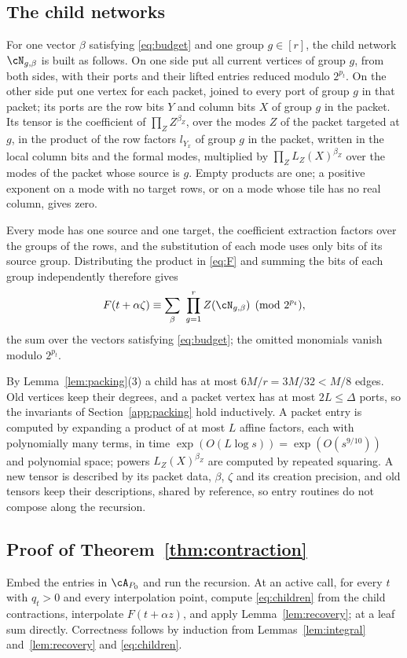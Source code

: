 \subsection{The child networks}\label{app:children}
For one vector $\beta$ satisfying \eqref{eq:budget} and one group $g\in[r]$, the
child network $\cN_{g,\beta}$ is built as follows. On one side put all current
vertices of group $g$, from both sides, with their ports and their lifted
entries reduced modulo $2^{p_t}$. On the other side put one vertex for each
packet, joined to every port of group $g$ in that packet; its ports are the row
bits $Y$ and column bits $X$ of group $g$ in the packet. Its tensor is the
coefficient of $\prod_ZZ^{\beta_Z}$, over the modes $Z$ of the packet targeted at
$g$, in the product of the row factors $l_{Y_x}$ of group $g$ in the packet,
written in the local column bits and the formal modes, multiplied by
$\prod_ZL_Z(X)^{\beta_Z}$ over the modes of the packet whose source is $g$. Empty
products are one; a positive exponent on a mode with no target rows, or on a
mode whose tile has no real column, gives zero.

Every mode has one source and one target, the coefficient extraction factors
over the groups of the rows, and the substitution of each mode uses only bits of
its source group. Distributing the product in \eqref{eq:F} and summing the bits
of each group independently therefore gives
\begin{equation}\label{eq:children}
F(t+\alpha\zeta)\equiv\sum_{\beta}\ \prod_{g=1}^rZ(\cN_{g,\beta})\pmod{2^{p_t}},
\end{equation}
the sum over the vectors satisfying \eqref{eq:budget}; the omitted monomials
vanish modulo $2^{p_t}$.

By Lemma~\ref{lem:packing}(3) a child has at most $6M/r=3M/32<M/8$ edges. Old
vertices keep their degrees, and a packet vertex has at most $2L\le\Delta$ ports,
so the invariants of Section~\ref{app:packing} hold inductively. A packet entry
is computed by expanding a product of at most $L$ affine factors, each with
polynomially many terms, in time $\exp(O(L\log s))=\exp(O(s^{9/10}))$ and
polynomial space; powers $L_Z(X)^{\beta_Z}$ are computed by repeated squaring. A
new tensor is described by its packet data, $\beta$, $\zeta$ and its creation
precision, and old tensors keep their descriptions, shared by reference, so
entry routines do not compose along the recursion.

\subsection{Proof of Theorem~\ref{thm:contraction}}\label{app:proof}
Embed the entries in $\cA_{P_0}$ and run the recursion. At an active call, for
every $t$ with $q_t>0$ and every interpolation point, compute
\eqref{eq:children} from the child contractions, interpolate $F(t+\alpha z)$,
and apply Lemma~\ref{lem:recovery}; at a leaf sum directly. Correctness follows
by induction from Lemmas~\ref{lem:integral} and~\ref{lem:recovery} and
\eqref{eq:children}.

